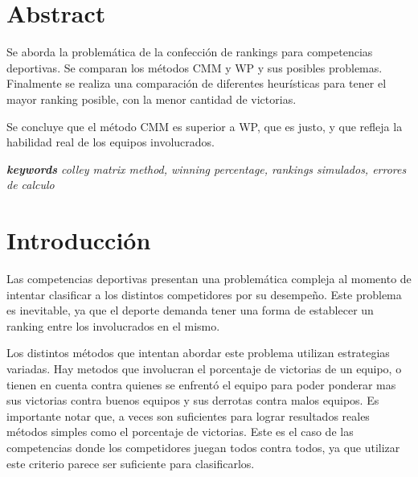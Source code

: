 \documentclass[a4paper]{article}
\begin{document}
\thispagestyle{empty}

\maketitle
\newpage

\thispagestyle{empty}
\vspace{3cm}
\setcounter{tocdepth}{4}
\setcounter{secnumdepth}{5}
\tableofcontents

\section{Abstract}

Se aborda la problemática de la confección de rankings para competencias deportivas. Se comparan los métodos CMM y WP y sus posibles problemas. Finalmente se realiza una comparación de diferentes heurísticas para tener el mayor ranking posible, con la menor cantidad de victorias.

Se concluye que el método CMM es superior a WP, que es justo, y que refleja la habilidad real de los equipos involucrados.

\textit{\textbf{keywords} colley matrix method, winning percentage, rankings simulados, errores de calculo}

\section{Introducción}

Las competencias deportivas presentan una problemática compleja al momento de intentar clasificar a los distintos competidores por su desempeño. Este problema es inevitable, ya que el deporte demanda tener una forma de establecer un ranking entre los involucrados en el mismo. 

Los distintos métodos que intentan abordar este problema utilizan estrategias variadas. Hay metodos que involucran el porcentaje de victorias de un equipo, o tienen en cuenta contra quienes se enfrentó el equipo para poder ponderar mas sus victorias contra buenos equipos y sus derrotas contra malos equipos. Es importante notar que, a veces son suficientes para lograr resultados reales métodos simples como el porcentaje de victorias. Este es el caso de las competencias donde los competidores juegan todos contra todos, ya que utilizar este criterio parece ser suficiente para clasificarlos.
\end{document}
